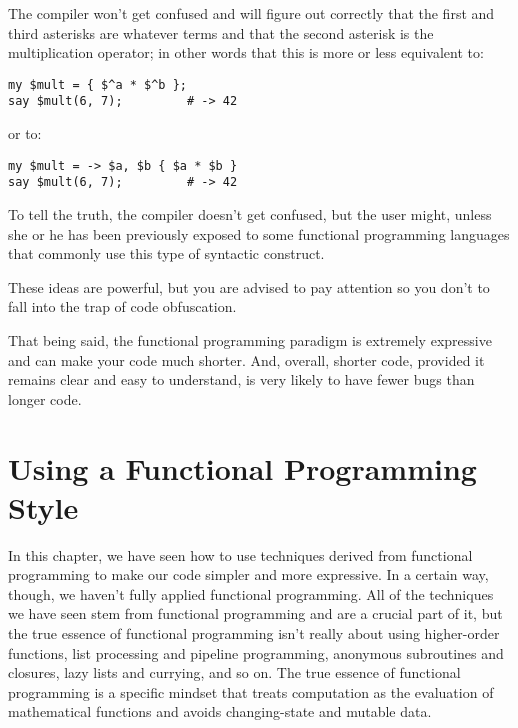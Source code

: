 The compiler won't get confused and will figure out 
correctly that the first and third asterisks are 
whatever terms and that the second asterisk is 
the multiplication operator; in other words that this is 
more or less equivalent to:

\begin{verbatim}
my $mult = { $^a * $^b };
say $mult(6, 7);         # -> 42
\end{verbatim}

or to:

\begin{verbatim}
my $mult = -> $a, $b { $a * $b }
say $mult(6, 7);         # -> 42  
\end{verbatim}

To tell the truth, the compiler doesn't get confused, 
but the user might, unless she or he has been previously 
exposed to some functional programming languages that 
commonly use this type of syntactic construct. 

These ideas are powerful, but you are advised to pay 
attention so you don't to fall into the trap of code 
obfuscation.

That being said, the functional programming paradigm 
is extremely expressive and can make your code much 
shorter. And, overall, shorter code, provided it remains 
clear and easy to understand, is very likely to have 
fewer bugs than longer code.

\section{Using a Functional Programming Style}
\label{funcstyle}

In this chapter, we have seen how to use techniques derived 
from functional programming to make our code simpler and 
more expressive. In a certain way, though, we haven't fully 
applied functional programming. All of the techniques we have 
seen stem from functional programming and are a crucial 
part of it, but the true essence of functional programming 
isn't really about using higher-order functions, list 
processing and pipeline programming, anonymous subroutines 
and closures, lazy lists and currying, and so on. 
The true essence of functional programming is a specific 
mindset that treats computation as the evaluation of mathematical 
functions and avoids changing-state and mutable data.

